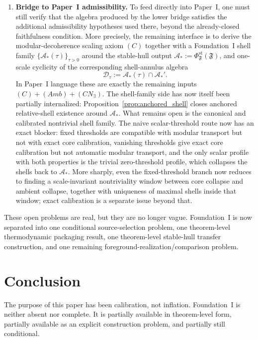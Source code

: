 \documentclass[12pt]{article}
\theoremstyle{definition}
\theoremstyle{remark}
\begin{document}
\begin{enumerate}
  canonical equivalence theorem, remains a separate strong-form problem.
\item \textbf{Bridge to Paper~I admissibility.} To feed directly into
  Paper~I, one must still verify that the algebra produced by the lower
  bridge satisfies the additional admissibility hypotheses used there,
  beyond the already-closed faithfulness condition. More precisely, the
  remaining interface is to derive the modular-decoherence scaling axiom
  \((C)\) together with a Foundation~I shell family
  \(\{\mathcal A_*(\tau)\}_{\tau>0}\) around the stable-hull output
  \(\mathcal A_*:=\Phi_{\mathfrak F}^{\mathrm{st}}(\mathfrak F)\), and
  one-scale cyclicity of the corresponding shell-annulus algebra
  \[
  \mathcal D_{\tau}:=\mathcal A_*(\tau)\cap \mathcal A_*'.
  \]
  In Paper~I language these are exactly the remaining inputs
  \((C)+(Amb)+(CN_\exists)\). The shell-family side has now itself been
  partially internalized: Proposition~\ref{prop:anchored_shell} closes
  anchored relative-shell existence around \(\mathcal A_*\). What
  remains open is the canonical and calibrated nontrivial shell family.
  The naive scalar-threshold route now has an exact blocker: fixed
  thresholds are compatible with modular transport but not with exact
  core calibration, vanishing thresholds give exact core calibration but
  not automatic modular transport, and the only scalar profile with
  both properties is the trivial zero-threshold profile, which
  collapses the shells back to \(\mathcal A_*\). More sharply, even the
  fixed-threshold branch now reduces to finding a scale-invariant
  nontriviality window between core collapse and ambient collapse,
  together with uniqueness of maximal shells inside that window; exact
  calibration is a separate issue beyond that.
\end{enumerate}

These open problems are real, but they are no longer vague. Foundation~I
is now separated into one conditional source-selection problem,
one theorem-level thermodynamic packaging result, one theorem-level
stable-hull transfer construction, and one remaining
foreground-realization/comparison problem.

\section{Conclusion}

The purpose of this paper has been calibration, not inflation.
Foundation~I is neither absent nor complete. It is partially available
in theorem-level form, partially available as an explicit construction
problem, and partially still conditional.
\end{document}
